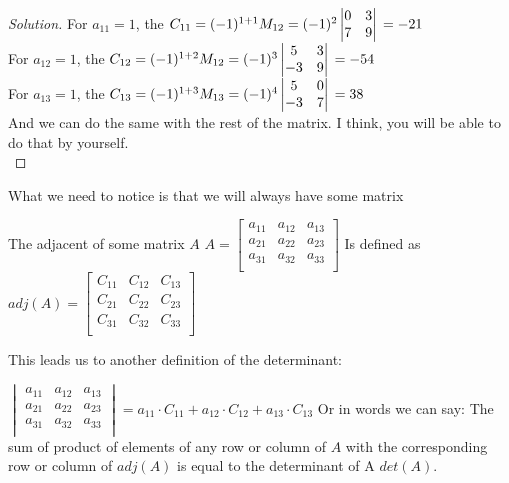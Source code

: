 \begin{proof}
    [Solution]
    For $a_{11}=1$, the $C_{11}=(-1)^{1+1}M_{12}\\
    = (-1)^{2}\begin{vmatrix}
        0 & 3\\
        7 & 9\\
    \end{vmatrix}\\
    = -21$\\
    For $a_{12}=1$, the $C_{12}=(-1)^{1+2}M_{12}\\
    = (-1)^{3}\begin{vmatrix}
        5 & 3\\
        -3 & 9\\
    \end{vmatrix}\\
    = -54$\\
    For $a_{13}=1$, the $C_{13}=(-1)^{1+3}M_{13}\\
    = (-1)^{4}\begin{vmatrix}
        5 & 0\\
        -3 & 7\\
    \end{vmatrix}\\
    = 38$\\
And we can do the same with the rest of the matrix. I think, you will be able to do that by yourself.\\
\end{proof}
What we need to notice is that we will always have some matrix 
\begin{definition}
The adjacent of some matrix $A$
$A= \begin{bmatrix}
    a_{11} & a_{12} & a_{13} \\
    a_{21} & a_{22} & a_{23} \\
    a_{31} & a_{32} & a_{33} \\
\end{bmatrix} $ Is defined as $adj(A) = \begin{bmatrix}
    C_{11} & C_{12} & C_{13} \\
    C_{21} & C_{22} & C_{23} \\
    C_{31} & C_{32} & C_{33} \\
\end{bmatrix}$\\
\end{definition}
This leads us to another definition of the determinant:\\
\begin{definition}
    $\begin{vmatrix}
        a_{11} & a_{12} & a_{13} \\
    a_{21} & a_{22} & a_{23} \\
    a_{31} & a_{32} & a_{33} \\
    \end{vmatrix} = a_{11} \cdot C_{11}+a_{12} \cdot C_{12}+a_{13} \cdot C_{13}$
    Or in words we can say: The sum of product of elements of any row or column of $A$ with the corresponding row or column of $adj(A)$ is equal to the determinant of A $det(A)$. 
\end{definition}

